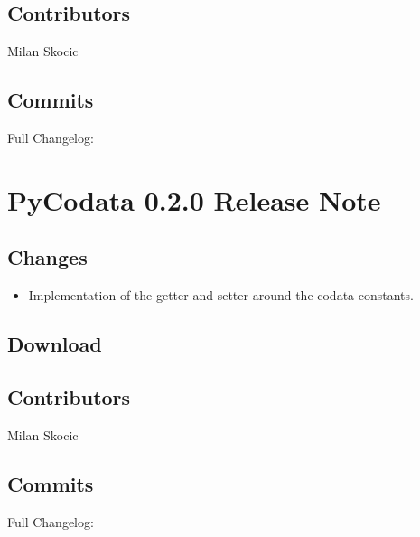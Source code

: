 \documentclass[a4paper,10pt,english]{sphinxmanual}
\begin{document}
\subsection{Contributors}
\label{\detokenize{releases/0.2.1-notes:contributors}}
\sphinxAtStartPar
Milan Skocic


\subsection{Commits}
\label{\detokenize{releases/0.2.1-notes:commits}}
\sphinxAtStartPar
Full Changelog: 

\sphinxstepscope


\section{PyCodata 0.2.0 Release Note}
\label{\detokenize{releases/0.2.0-notes:pycodata-0-2-0-release-note}}\label{\detokenize{releases/0.2.0-notes::doc}}

\subsection{Changes}
\label{\detokenize{releases/0.2.0-notes:changes}}\begin{itemize}
\item {} 
\sphinxAtStartPar
Implementation of the getter and setter around the codata constants.

\end{itemize}


\subsection{Download}
\label{\detokenize{releases/0.2.0-notes:download}}
\sphinxAtStartPar
{}


\subsection{Contributors}
\label{\detokenize{releases/0.2.0-notes:contributors}}
\sphinxAtStartPar
Milan Skocic


\subsection{Commits}
\label{\detokenize{releases/0.2.0-notes:commits}}
\sphinxAtStartPar
Full Changelog: 
\end{document}
